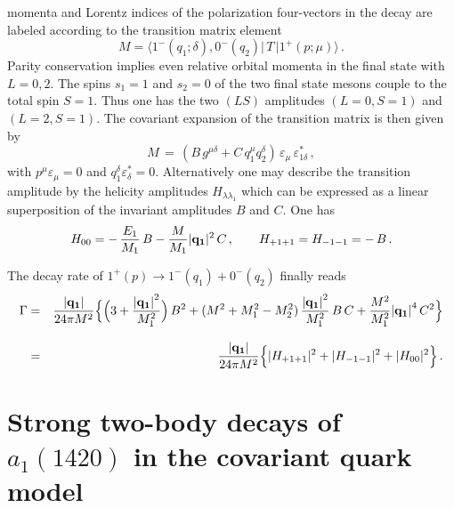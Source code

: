 \documentclass[aps,prd,floatfix,superscriptaddress,showpacs,showkeys]{revtex4}
\newcommand{\bea}{\begin{eqnarray}}
\newcommand{\ena}{\end{eqnarray}}
\newcommand{\be}{\begin{equation}}
\newcommand{\en}{\end{equation}}
\newcommand{\nn}{\nonumber\\}
\begin{document}
momenta and Lorentz indices of the polarization four-vectors
in the decay are labeled according to the transition matrix element
\be
M=\langle 1^- (q_1;\delta), 0^-(q_2) |\,T\,|1^+(p;\mu)\rangle \,.
\label{eq:1m0m}
\en
Parity conservation implies even relative orbital momenta in the final state 
with $L=0,2$. 
The spins $s_1=1$ and $s_2=0$ of the two final state mesons couple 
to the total 
spin $S=1$. Thus one has the two $(LS)$ amplitudes $(L=0,S=1)$
and  $(L=2,S=1)$. The covariant expansion of the transition matrix 
is then given by
\be
M\,=\,(B\,g^{\mu \delta}+ C\,q_1^\mu q_2^\delta)\,
\varepsilon_\mu\,\varepsilon^\ast_{1\delta}\,, 
\label{eq:A3}
\en
with $p^\mu\varepsilon_\mu=0$ and $q_1^\delta\varepsilon^\ast_\delta=0$.
Alternatively one may describe the transition amplitude by the
helicity amplitudes $H_{\lambda\lambda_1}$ which can be expressed as a linear
superposition of the invariant amplitudes $B$ and $C$. One has
\be
H_{00} = -\,\frac{E_1}{M_1}\,B - \frac{M}{M_1}{|\bf q_1}|^2 \,C\,, \qquad
H_{+1+1} = H_{-1-1}=-\,B\,.
\label{eq:A5}
\en

The decay rate of $1^+(p)\to 1^-(q_1) + 0^-(q_2)$ finally reads
\bea
\Gamma &=&
\frac{\bf|q_1|}{24\pi M^2}
\Big\{ 
\Big( 3 + \frac{ {\bf|q_1|}^2}{M^2_1}\Big)\,B^2
+ (M^2+M_1^2-M_2^2)\,\frac{ {\bf|q_1|}^2}{M_1^2}\, B\,C
+ \frac{M^2}{M_1^2}{\bf|q_1|}^4\,C^2 \Big\}
\nn[2ex]
&= & \frac{\bf|q_1|}{24\pi M^2}
\Big\{ |H_{+1+1}|^2 +  |H_{-1-1}|^2 +  |H_{00}|^2 \Big\}\,.
\label{eq:width1m0m}
\ena
 
\section{Strong two-body decays of $a_1(1420)$ in the covariant quark model} 
\label{sec:model-calculas}
\end{document}
